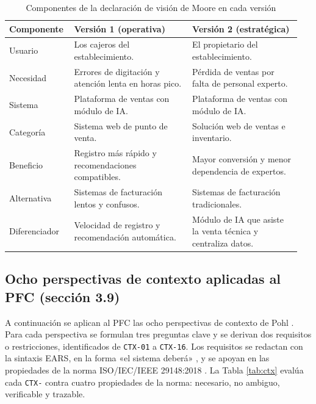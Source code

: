 \documentclass[onecolumn,12pt]{IEEEtran}
\begin{document}
\begin{table}[htbp]
\caption{Componentes de la declaraci\'on de visi\'on de Moore en cada versi\'on}
\label{tab:moore}
\centering
\footnotesize
\begin{tabular}{@{}p{0.20\linewidth}p{0.39\linewidth}p{0.36\linewidth}@{}}
\toprule
\textbf{Componente} & \textbf{Versi\'on 1 (operativa)} & \textbf{Versi\'on 2 (estrat\'egica)}\\
\midrule
Usuario & Los cajeros del establecimiento. & El propietario del establecimiento.\\
Necesidad & Errores de digitaci\'on y atenci\'on lenta en horas pico. & P\'erdida de ventas por falta de personal experto.\\
Sistema & Plataforma de ventas con m\'odulo de IA. & Plataforma de ventas con m\'odulo de IA.\\
Categor\'ia & Sistema web de punto de venta. & Soluci\'on web de ventas e inventario.\\
Beneficio & Registro m\'as r\'apido y recomendaciones compatibles. & Mayor conversi\'on y menor dependencia de expertos.\\
Alternativa & Sistemas de facturaci\'on lentos y confusos. & Sistemas de facturaci\'on tradicionales.\\
Diferenciador & Velocidad de registro y recomendaci\'on autom\'atica. & M\'odulo de IA que asiste la venta t\'ecnica y centraliza datos.\\
\bottomrule
\end{tabular}
\end{table}

\subsection{Ocho perspectivas de contexto aplicadas al PFC (secci\'on 3.9)}
A continuaci\'on se aplican al PFC las ocho perspectivas de contexto de Pohl \cite{pohl2025}. Para cada perspectiva se formulan tres preguntas clave y se derivan dos requisitos o restricciones, identificados de \texttt{CTX-01} a \texttt{CTX-16}. Los requisitos se redactan con la sintaxis EARS, en la forma «el sistema deber\'a» \cite{mavin2009}, y se apoyan en las propiedades de la norma ISO/IEC/IEEE 29148:2018 \cite{iso29148}. La Tabla \ref{tab:ctx} eval\'ua cada \texttt{CTX-} contra cuatro propiedades de la norma: necesario, no ambiguo, verificable y trazable.
\end{document}
